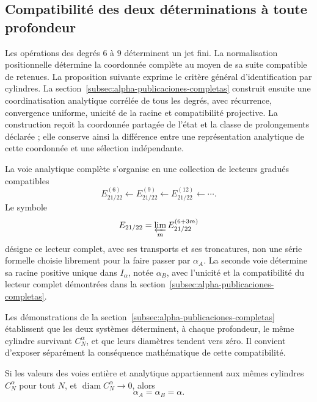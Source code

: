 \subsection{Compatibilité des deux déterminations à toute profondeur}
\label{subsec:alpha-limite-dos-vias}

\begin{remark}
Les opérations des degrés \(6\) à \(9\) déterminent un jet fini. La normalisation positionnelle détermine la coordonnée complète au moyen de sa suite compatible de retenues. La proposition suivante exprime le critère général d'identification par cylindres. La section~\ref{subsec:alpha-publicaciones-completas} construit ensuite une coordinatisation analytique corrélée de tous les degrés, avec récurrence, convergence uniforme, unicité de la racine et compatibilité projective. La construction reçoit la coordonnée partagée de l'état et la classe de prolongements déclarée ; elle conserve ainsi la différence entre une représentation analytique de cette coordonnée et une sélection indépendante.
\end{remark}

La voie analytique complète s'organise en une collection de lecteurs gradués compatibles
\[
 E_{21/22}^{(6)}\longleftarrow E_{21/22}^{(9)}
 \longleftarrow E_{21/22}^{(12)}\longleftarrow\cdots.
\]
Le symbole
\[
 E_{21/22}=\varprojlim_m E_{21/22}^{(6+3m)}
\]
désigne ce lecteur complet, avec ses transports et ses troncatures, non une
série formelle choisie librement pour la faire passer par \(\alpha_A\).
La seconde voie détermine sa racine positive unique dans \(I_\alpha\),
notée \(\alpha_B\), avec l’unicité et la compatibilité du
lecteur complet démontrées dans la section~\ref{subsec:alpha-publicaciones-completas}.

Les démonstrations de la section~\ref{subsec:alpha-publicaciones-completas}
établissent que les deux systèmes déterminent, à chaque profondeur, le même
cylindre survivant \(C_N^\alpha\), et que leurs diamètres tendent vers
zéro. Il convient d’exposer séparément la conséquence mathématique de cette
compatibilité.

\begin{proposition}
\label{prop:alpha-dos-limites}
Si les valeurs des voies entière et analytique appartiennent aux mêmes cylindres \(C_N^\alpha\) pour tout \(N\), et
\(\operatorname{diam}C_N^\alpha\to0\), alors
\[
 \alpha_A=\alpha_B=\alpha.
\]
\end{proposition}

